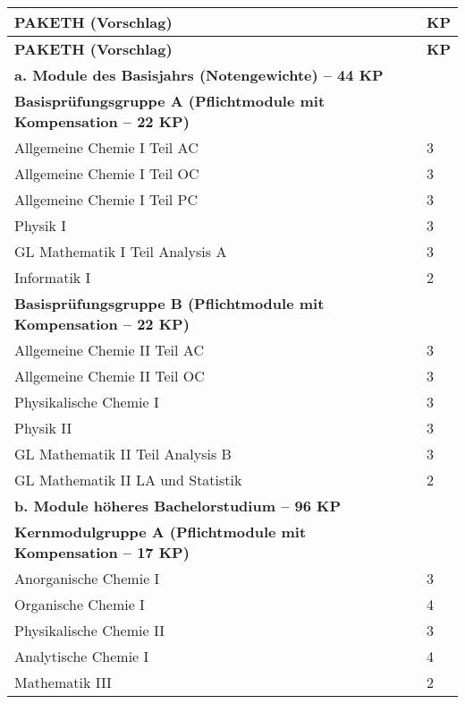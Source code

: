 \documentclass[a4paper]{article}
\begin{document}
\begin{longtable}{|p{}|p{}|}
\hline
\rowcolor{gray!15}
\textbf{PAKETH (Vorschlag)} & \textbf{KP} \\
\hline
\endfirsthead

\hline
\rowcolor{gray!15}
\textbf{PAKETH (Vorschlag)} & \textbf{KP} \\
\hline
\endhead

\multicolumn{2}{|l|}{\textbf{a. Module des Basisjahrs (Notengewichte) – 44 KP}} \\ \hline

\textbf{Basisprüfungsgruppe A (Pflichtmodule mit Kompensation – 22 KP)} & \\ \hline
Allgemeine Chemie I Teil AC & 3 \\ \hline
Allgemeine Chemie I Teil OC & 3 \\ \hline
Allgemeine Chemie I Teil PC & 3 \\ \hline
Physik I & 3 \\ \hline
GL Mathematik I Teil Analysis A & 3 \\ \hline
Informatik I & 2 \\ \hline

\textbf{Basisprüfungsgruppe B (Pflichtmodule mit Kompensation – 22 KP)} & \\ \hline
Allgemeine Chemie II Teil AC & 3 \\ \hline
Allgemeine Chemie II Teil OC & 3 \\ \hline
Physikalische Chemie I & 3 \\ \hline
Physik II & 3 \\ \hline
GL Mathematik II Teil Analysis B & 3 \\ \hline
GL Mathematik II LA und Statistik & 2 \\ \hline

\multicolumn{2}{|l|}{\textbf{b. Module höheres Bachelorstudium – 96 KP}} \\ \hline

\textbf{Kernmodulgruppe A (Pflichtmodule mit Kompensation – 17 KP)} & \\ \hline
Anorganische Chemie I & 3 \\ \hline
Organische Chemie I & 4 \\ \hline
Physikalische Chemie II & 3 \\ \hline
Analytische Chemie I & 4 \\ \hline
Mathematik III & 2 \\ \hline


\end{longtable}
\end{document}
